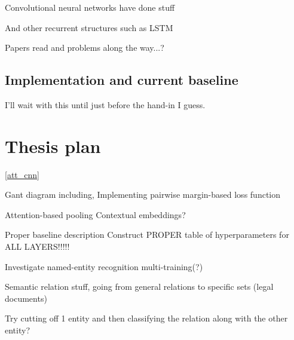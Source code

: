 \documentclass{article}
\begin{document}
Convolutional neural networks have done stuff

And other recurrent structures such as LSTM



Papers read and problems along the way...?


\subsection{Implementation and current baseline}

I'll wait with this until just before the hand-in I guess.


\section{Thesis plan}

\ref{att_cnn}
\cite{att_cnn}

\begin{center}
\end{center}


Gant diagram including,
Implementing pairwise margin-based loss function

Attention-based pooling
Contextual embeddings?

Proper baseline description
Construct PROPER table of hyperparameters for ALL LAYERS!!!!!

Investigate named-entity recognition multi-training(?)

Semantic relation stuff, going from general relations to specific
sets (legal documents)

Try cutting off 1 entity and then classifying the relation along with the other entity?






    
\end{document}
